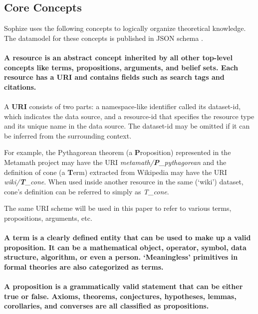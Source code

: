 \documentclass[runningheads]{llncs}
\begin{document}
\subsection{Core Concepts}
\label{sec:core}
Sophize uses the following concepts to logically organize theoretical knowledge. The datamodel for these concepts is published in JSON schema \cite{sophize_datamodel}.

\paragraph{A \textbf{resource} is an abstract concept inherited by all other top-level concepts like terms, propositions, arguments, and belief sets. Each resource has a URI and contains fields such as search tags and citations.}
\paragraph{}
A \textbf{URI} consists of two parts: a namespace-like identifier called its dataset-id, which indicates the data source, and a resource-id that specifies the resource type and its unique name in the data source. The dataset-id may be omitted if it can be inferred from the surrounding context.

For example, the Pythagorean theorem (a \textbf{P}roposition) represented in the Metamath project may have the URI \emph{metamath/\textbf{P}\_pythagorean} and the definition of cone (a \textbf{T}erm) extracted from Wikipedia may have the URI \emph{wiki/\textbf{T}\_cone}. When used inside another resource in the same (`wiki') dataset, cone's definition can be referred to simply as \emph{T\_cone}.

The same URI scheme will be used in this paper to refer to various terms, propositions, arguments, etc.

\paragraph{A \textbf{term} is a clearly defined entity that can be used to make up a valid proposition. It can be a mathematical object, operator, symbol, data structure, algorithm, or even a person. `Meaningless' primitives in formal theories are also categorized as terms.}

\paragraph{A \textbf{proposition} is a grammatically valid statement that can be either true or false. Axioms, theorems, conjectures, hypotheses, lemmas, corollaries, and converses are all classified as propositions.}
\end{document}
